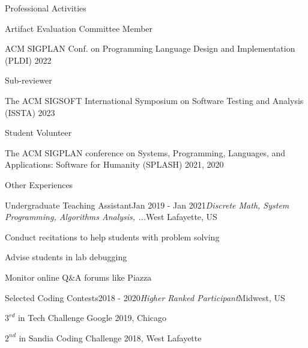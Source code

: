\documentclass{resume} %
\begin{document}
\begin{rSection}{Professional Activities}

\begin{rSubsection}{Artifact Evaluation Committee Member}{}{}{}
    \item ACM SIGPLAN Conf. on Programming Language Design and Implementation (PLDI) 2022
\end{rSubsection}

\begin{rSubsection}{Sub-reviewer}{}{}{}
    \item The ACM SIGSOFT International Symposium on Software Testing and Analysis (ISSTA) 2023
\end{rSubsection}

\begin{rSubsection}{Student Volunteer}{}{}{}
    \item The ACM SIGPLAN conference on Systems, Programming, Languages, and Applications: Software for Humanity (SPLASH) 2021, 2020
\end{rSubsection}

\end{rSection}

\begin{rSection}{Other Experiences}

\begin{rSubsection}{Undergraduate Teaching Assistant}{Jan 2019 - Jan 2021}{\textit{Discrete Math, System Programming, Algorithms Analysis, ...}}{West Lafayette, US}
\item Conduct recitations to help students with problem solving
\item Advise students in lab debugging
\item Monitor online Q\&A forums like Piazza
\end{rSubsection}

\begin{rSubsection}{Selected Coding Contests}{2018 - 2020}{\it Higher Ranked Participant}{Midwest, US}
\item $3^{rd}$ in Tech Challenge Google 2019, Chicago
\item $2^{nd}$ in Sandia Coding Challenge 2018, West Lafayette

\end{rSubsection}


\end{rSection}

\end{document}
